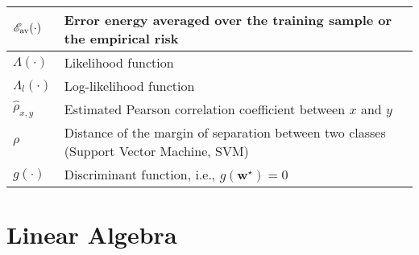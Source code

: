 \documentclass{article}
\begin{document}
\begin{xltabular}{\textwidth}{XX}
	\(\mathscr{E}_{\textnormal{av}}(\cdot)\)                                                                              & Error energy averaged over the training sample or the empirical risk  \cite{bishopPatternRecognitionMachine2006}                                                                                                             \\ \hline
	\(\Lambda(\cdot)\)                                                                                                    & Likelihood function                                                                                                                                                                                                          \\ \hline
	\(\Lambda_l(\cdot)\)                                                                                                  & Log-likelihood function                                                                                                                                                                                                      \\ \hline
	\(\hat{\rho}_{x,y}\)                                                                                                  & Estimated Pearson correlation coefficient between \(x\) and \(y\)                                                                                                                                                            \\ \hline
	\(\rho\)                                                                                                              & Distance of the margin of separation between two classes (Support Vector Machine, SVM)                                                                                                                                       \\ \hline
	\(g(\cdot)\)                                                                                                          & Discriminant function, i.e., \(g(\mathbf{w}^{\star}) = 0\)
\end{xltabular}

\section{Linear Algebra}
\end{document}

